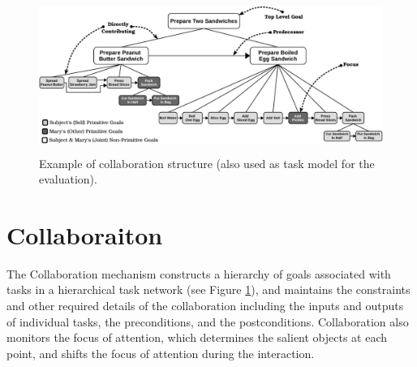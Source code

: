 \documentclass{aamas2016_extendedabstract}
\begin{document}
\begin{figure}
  \centering
  \vspace*{-5mm}
  \includegraphics[width=14.3cm,height=5.0cm]{figure/taskModel-croped.pdf}
  \vspace*{-3mm}
  \caption{Example of collaboration structure (also used as task model for
  the evaluation).}
  \label{fig:taskModel}
  \vspace*{-5mm}
\end{figure}


\section{Collaboraiton}

The Collaboration mechanism constructs a hierarchy of goals associated with
tasks in a hierarchical task network (see Figure \ref{fig:taskModel}), and
maintains the constraints and other required details of the collaboration
including the inputs and outputs of individual tasks, the preconditions, and the
postconditions. Collaboration also monitors the focus of attention, which
determines the salient objects at each point, and shifts the focus of attention
during the interaction.
\end{document}

